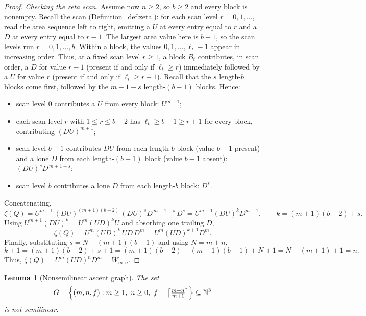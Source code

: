 \documentclass[11pt]{article}
\newtheorem{lemma}[theorem]{Lemma}
\theoremstyle{definition}
\newcommand{\N}{\mathbb N}
\begin{document}
\begin{proof}
\vspace{0.5em}
\noindent\emph{Checking the zeta scan.}
Assume now $n\ge 2$, so $b\ge 2$ and every block is nonempty.  Recall the scan
(Definition~\ref{def:zeta}): for each scan level $r=0,1,\ldots$, read the area sequence
left to right, emitting a $U$ at every entry equal to $r$ and a $D$ at every entry
equal to $r-1$.  The largest area value here is $b-1$, so the scan levels run
$r=0,1,\ldots,b$.  Within a block, the values $0,1,\ldots,\ell_t-1$ appear in
increasing order.  Thus, at a fixed scan level $r\ge 1$, a block $B_t$ contributes, in scan
order, a $D$ for value $r-1$ (present if and only if $\ell_t\ge r$) immediately
followed by a $U$ for value $r$ (present if and only if $\ell_t\ge r+1$).  Recall
that the $s$ length-$b$ blocks come first, followed by the $m+1-s$
length-$(b-1)$ blocks.
Hence:
\begin{itemize}
\item scan level $0$ contributes a $U$ from every block: $U^{m+1}$;
\item each scan level $r$ with $1\le r\le b-2$ has $\ell_t\ge b-1\ge r+1$ for
every block, contributing $(DU)^{m+1}$;
\item scan level $b-1$ contributes $DU$ from each length-$b$ block (value $b-1$
present) and a lone $D$ from each length-$(b-1)$ block (value $b-1$
absent): $(DU)^sD^{\,m+1-s}$;
\item scan level $b$ contributes a lone $D$ from each length-$b$ block: $D^s$.
\end{itemize}
Concatenating,
\[
   \zeta(Q)=U^{m+1}\,(DU)^{(m+1)(b-2)}\,(DU)^sD^{\,m+1-s}\,D^s
          =U^{m+1}(DU)^{k}D^{m+1},\qquad k=(m+1)(b-2)+s.
\]
Using $U^{m+1}(DU)^k=U^m(UD)^kU$ and absorbing one trailing $D$,
\[
   \zeta(Q)=U^m(UD)^k\,UD\,D^m=U^m(UD)^{k+1}D^m.
\]
Finally, substituting $s=N-(m+1)(b-1)$ and using $N=m+n$,
\[
   k+1=(m+1)(b-2)+s+1
      =(m+1)(b-2)-(m+1)(b-1)+N+1
      =N-(m+1)+1=n.
\]
Thus, $\zeta(Q)=U^m(UD)^nD^m=W_{m,n}$.
\end{proof}

\begin{lemma}[Nonsemilinear ascent graph]
\label{lem:inverse-zeta-not-semilinear}
The set
\[
   G=\Bigl\{(m,n,f):m\ge 1,\ n\ge 0,\
                    f=\bigl\lceil\tfrac{m+n}{m+1}\bigr\rceil\Bigr\}\subseteq\N^3
\]
is not semilinear.
\end{lemma}
\end{document}
